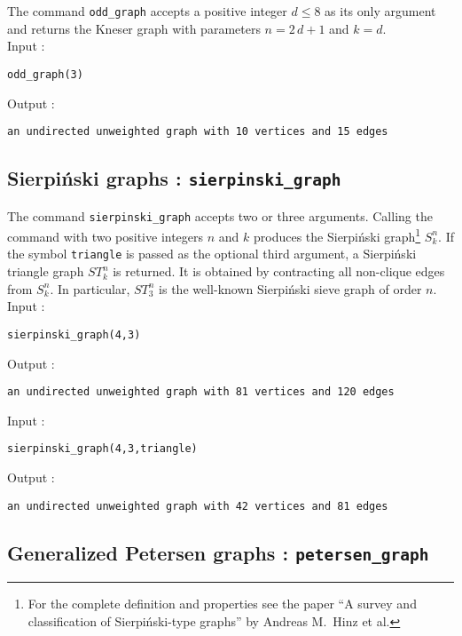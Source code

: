 \documentclass[a4paper,11pt]{article}
\begin{document}
The command {\tt odd\_graph} accepts a positive integer $ d\leq 8 $ as its only argument and returns the Kneser graph with parameters $ n=2\,d+1 $ and $ k=d $.\\
Input :
\begin{center}
  \tt odd\_graph(3)
\end{center}
Output :
\begin{center}
  \tt an undirected unweighted graph with 10 vertices and 15 edges
\end{center}

\subsection{Sierpiński graphs : {\tt sierpinski\_graph}}

The command {\tt sierpinski\_graph} accepts two or three arguments. Calling the command with two positive integers $ n $ and $ k $ produces the Sierpiński graph\footnote{For the complete definition and properties see the paper ``A survey and classification of Sierpiński-type
graphs'' by Andreas M.~Hinz et al.} $ S_k^n $. If the symbol {\tt triangle} is passed as the optional third argument, a Sierpiński triangle graph $ ST_k^n $ is returned. It is obtained by contracting all non-clique edges from $ S_k^n $. In particular, $ ST_3^n $ is the well-known Sierpiński sieve graph of order $ n $.\\
Input :
\begin{center}
  \tt sierpinski\_graph(4,3)
\end{center}
Output :
\begin{center}
  \tt an undirected unweighted graph with 81 vertices and 120 edges
\end{center}
Input :
\begin{center}
  \tt sierpinski\_graph(4,3,triangle)
\end{center}
Output :
\begin{center}
  \tt an undirected unweighted graph with 42 vertices and 81 edges
\end{center}

\subsection{Generalized Petersen graphs : {\tt petersen\_graph}}
\end{document}
